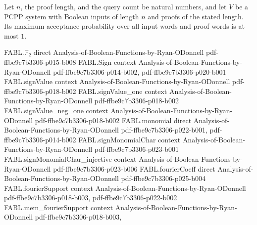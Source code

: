 \begin{theorem}
\label{FABL.PCPPSystem.optimumAcceptance_le_one}
\leanok
{}
Let $n$, the proof length, and the query count be natural numbers, and let $V$ be a PCPP
system with Boolean inputs of length $n$ and proofs of the stated length. Its maximum
acceptance probability over all input words and proof words is at most $1$.
\end{theorem}

\begin{theorem}
\label{FABL.PCPPSystem.rejectionProbability_gt_rate_of_property_empty}
\leanok
{}
\proofstep
  {FABL.𝔽₂}
  {direct}
  {Analysis-of-Boolean-Functions-by-Ryan-ODonnell}
  {pdf-ffbe9c7b3306-p015-b008}
\proofstep
  {FABL.Sign}
  {context}
  {Analysis-of-Boolean-Functions-by-Ryan-ODonnell}
  {pdf-ffbe9c7b3306-p014-b002,
    pdf-ffbe9c7b3306-p020-b001}
\proofstep
  {FABL.signValue}
  {context}
  {Analysis-of-Boolean-Functions-by-Ryan-ODonnell}
  {pdf-ffbe9c7b3306-p018-b002}
\proofstep
  {FABL.signValue_one}
  {context}
  {Analysis-of-Boolean-Functions-by-Ryan-ODonnell}
  {pdf-ffbe9c7b3306-p018-b002}
\proofstep
  {FABL.signValue_neg_one}
  {context}
  {Analysis-of-Boolean-Functions-by-Ryan-ODonnell}
  {pdf-ffbe9c7b3306-p018-b002}
\proofstep
  {FABL.monomial}
  {direct}
  {Analysis-of-Boolean-Functions-by-Ryan-ODonnell}
  {pdf-ffbe9c7b3306-p022-b001,
    pdf-ffbe9c7b3306-p014-b002}
\proofstep
  {FABL.signMonomialChar}
  {context}
  {Analysis-of-Boolean-Functions-by-Ryan-ODonnell}
  {pdf-ffbe9c7b3306-p023-b001}
\proofstep
  {FABL.signMonomialChar_injective}
  {context}
  {Analysis-of-Boolean-Functions-by-Ryan-ODonnell}
  {pdf-ffbe9c7b3306-p023-b006}
\proofstep
  {FABL.fourierCoeff}
  {direct}
  {Analysis-of-Boolean-Functions-by-Ryan-ODonnell}
  {pdf-ffbe9c7b3306-p025-b004}
\proofstep
  {FABL.fourierSupport}
  {context}
  {Analysis-of-Boolean-Functions-by-Ryan-ODonnell}
  {pdf-ffbe9c7b3306-p018-b003,
    pdf-ffbe9c7b3306-p022-b002}
\proofstep
  {FABL.mem_fourierSupport}
  {context}
  {Analysis-of-Boolean-Functions-by-Ryan-ODonnell}
  {pdf-ffbe9c7b3306-p018-b003,
}
\end{theorem}
